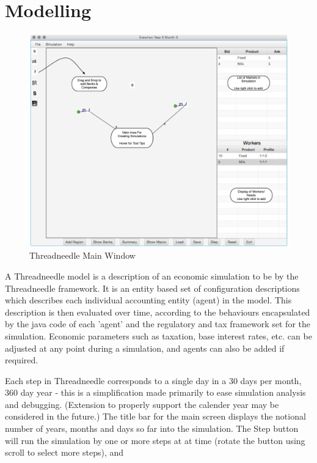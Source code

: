 \documentclass[10pt,oneside,openright, a4paper]{memoir}
\begin{document}
\section{Modelling}
\begin{figure}[ht]
\begin{center}
\includegraphics[width=14cm]{images/fig_mainScreen.eps}
\caption{Threadneedle Main Window}
\label{fig:mainscreen}
\end{center}
\end{figure}
A Threadneedle model is a description of an economic simulation to be
by the Threadneedle framework. It is an entity based set of
configuration descriptions which describes each individual accounting 
entity (agent) in the model. This description is then evaluated over time, 
according to the behaviours encapsulated by the java code of each
'agent' and the regulatory and tax framework set for the simulation. 
Economic parameters such as taxation, base interest rates, etc. can be
adjusted at any point during a simulation, and agents can also be
added if required.
\par
Each step in Threadneedle corresponds to a single day in a 30 days per
month, 360 day year - this is a simplification made primarily to ease
simulation analysis and debugging. (Extension to properly support the 
calender year may be considered in the future.)  
The title bar for the main screen displays the notional number of 
years, months and days
so far into the simulation. The Step button will run the simulation by one
or more steps at at time (rotate the button using scroll to select more steps), and
\end{document}
